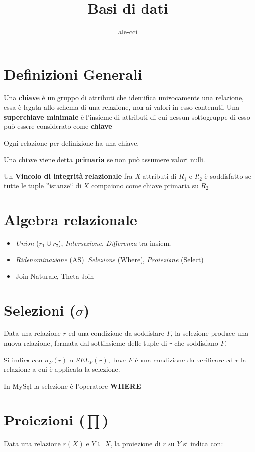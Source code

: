 \documentclass{paper}
\title{Basi di dati}
\author{ale-cci}
\begin{document}
\lstset{language=SQL}
\maketitle

\section{Definizioni Generali}
Una \textbf{chiave} è un gruppo di attributi che identifica univocamente una relazione, essa è legata allo schema di una relazione, non ai valori in esso contenuti.
Una \textbf{superchiave minimale} è l'insieme di attributi di cui nessun sottogruppo di esso può essere considerato come \textbf{chiave}.

Ogni relazione per definizione ha una chiave.

Una chiave viene detta \textbf{primaria} se non può assumere valori nulli.

Un \textbf{Vincolo di integrità relazionale} fra $X$ attributi di $R_1$ e $R_2$ è soddisfatto se tutte le tuple ''istanze`` di $X$ compaiono come chiave primaria su $R_2$
\section{Algebra relazionale}
\begin{itemize}
    \item \textit{Union} ($r_1 \cup r_2$), \textit{Intersezione}, \textit{Differenza} tra insiemi
    \item \textit{Ridenominazione} (AS), \textit{Selezione} (Where), \textit{Proiezione} (Select)
    \item Join Naturale, Theta Join
\end{itemize}

\section{Selezioni ($\sigma$)}

Data una relazione $r$ ed una condizione da soddisfare $F$, la selezione produce una nuova relazione,
formata dal sottinsieme delle tuple di $r$ che soddisfano $F$.

Si indica con $\sigma_F(r)$ o $SEL_F(r)$, dove $F$ è una condizione da verificare ed $r$ la relazione a cui è applicata la selezione.

In MySql la selezione è l'operatore \textbf{WHERE}

\section{Proiezioni ($\prod$)}
Data una relazione $r(X)$ e $Y \subseteq X$, la proiezione di $r$ su $Y$ si indica con:
\end{document}
